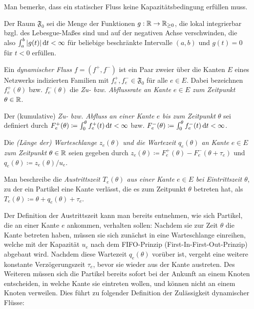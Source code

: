 Man bemerke, dass ein statischer Fluss keine Kapazitätsbedingung erfüllen muss.



\begin{definition}
	Der Raum $\mathfrak{F}_0$ sei die Menge der Funktionen $g: \mathbb{R} \to \mathbb{R}_{\geq 0}$, die lokal integrierbar bzgl. des Lebesgue-Maßes sind und auf der negativen Achse verschwinden, die also $\int_a^b |g(t)| \mathop{}\!\mathrm{d} t< \infty$ für beliebige beschränkte Intervalle $(a,b)$ und $g(t)=0$ für $t<0$ erfüllen.
\end{definition}

\begin{definition}
	Ein \emph{dynamischer Fluss $f=(f^+, f^-)$} ist ein Paar zweier über die Kanten $E$ eines Netzwerks indizierten Familien mit $f^+_e,f^-_e\in\mathfrak F_0$ für alle $e\in E$.
	Dabei bezeichnen $f_e^+(\theta)$ bzw. $f_e^-(\theta)$ die \emph{Zu- bzw. Abflussrate an Kante $e\in E$ zum Zeitpunkt $\theta\in\mathbb{R}$}.
	
	Der (kumulative) \emph{Zu- bzw. Abfluss an einer Kante $e$ bis zum Zeitpunkt $\theta$} sei definiert durch $F^+_e(\theta)\coloneq\int_0^\theta f^+_e(t) \mathop{}\!\mathrm{d} t<\infty$ bzw. $F^-_e(\theta)\coloneq\int_0^\theta f^-_e(t) \mathop{}\!\mathrm{d} t<\infty$.
	
	Die \emph{(Länge der) Warteschlange $z_e(\theta)$ und die Wartezeit $q_e(\theta)$ an Kante $e\in E$ zum Zeitpunkt $\theta\in\mathbb{R}$} seien gegeben durch $z_e(\theta)\coloneq F_e^+(\theta) - F_e^-(\theta + \tau_e)$ und $q_e(\theta) \coloneq z_e(\theta) / u_e$.
	
	Man beschreibe die \emph{Austrittszeit $T_e(\theta)$ aus einer Kante $e\in E$ bei Eintrittszeit $\theta$}, zu der ein Partikel eine Kante verlässt, die es zum Zeitpunkt $\theta$ betreten hat, als $T_e(\theta)\coloneq\theta + q_e(\theta) + \tau_e$.
\end{definition}

Der Definition der Austrittszeit kann man bereits entnehmen, wie sich Partikel, die an einer Kante $e$ ankommen, verhalten sollen:
Nachdem sie zur Zeit $\theta$ die Kante betreten haben, müssen sie sich zunächst in eine Warteschlange einreihen, welche mit der Kapazität $u_e$ nach dem FIFO-Prinzip (First-In-First-Out-Prinzip) abgebaut wird.
Nachdem diese Wartezeit $q_e(\theta)$ vorüber ist, vergeht eine weitere konstante Verzögerungszeit $\tau_e$, bevor sie wieder aus der Kante austreten.
Des Weiteren müssen sich die Partikel bereits sofort bei der Ankunft an einem Knoten entscheiden, in welche Kante sie eintreten wollen, und können nicht an einem Knoten verweilen.
Dies führt zu folgender Definition der Zulässigkeit dynamischer Flüsse:

